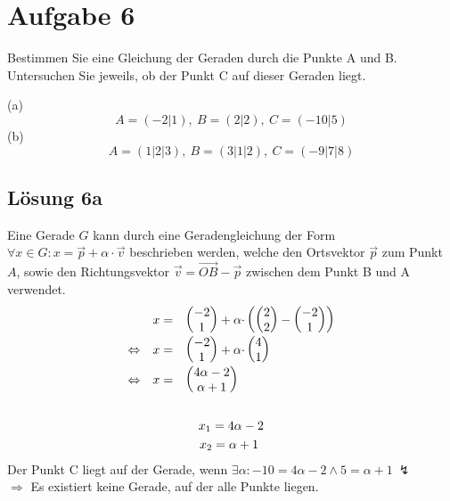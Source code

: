\section{Aufgabe 6}

Bestimmen Sie eine Gleichung der Geraden durch die Punkte A und B. Untersuchen Sie jeweils, ob der Punkt C auf dieser Geraden liegt.

(a)
\begin{equation*}
  A=( -2|1) ,\ B=( 2|2) ,\ C=( -10|5)
\end{equation*}
(b)
\begin{equation*}
  A=( 1|2|3) ,\ B=( 3|1|2) ,\ C=( -9|7|8)
\end{equation*}

\subsection{Lösung 6a}

Eine Gerade $\displaystyle G$ kann durch eine Geradengleichung der Form $\displaystyle \forall x\in G:x=\vec{p} +\alpha \cdotp \vec{v}$ beschrieben werden, welche den Ortsvektor $\displaystyle \vec{p}$ zum Punkt $\displaystyle A$, sowie den Richtungsvektor $\displaystyle \vec{v} =\overrightarrow{OB} -\vec{p}$ zwischen dem Punkt B und A verwendet.
\begin{gather*}
  \begin{array}{ c r l }
    & x= & \begin{pmatrix}
      -2\\
      1
    \end{pmatrix} +\alpha \cdotp \left(\begin{pmatrix}
      2\\
      2
    \end{pmatrix} -\begin{pmatrix}
      -2\\
      1
    \end{pmatrix}\right)\\
    \Leftrightarrow  & x= & \begin{pmatrix}
      -2\\
      1
    \end{pmatrix} +\alpha \cdotp \begin{pmatrix}
      4\\
      1
    \end{pmatrix}\\
    \Leftrightarrow  & x= & \begin{pmatrix}
      4\alpha -2\\
      \alpha +1
    \end{pmatrix}
  \end{array}\\
  \\
  x_{1} =4\alpha -2\\
  x_{2} =\alpha +1\ 
\end{gather*}
Der Punkt C liegt auf der Gerade, wenn $\displaystyle \exists \alpha :-10=4\alpha -2\land 5=\alpha +1\ \lightning $
\\
$\Rightarrow$ Es existiert keine Gerade, auf der alle Punkte liegen.

